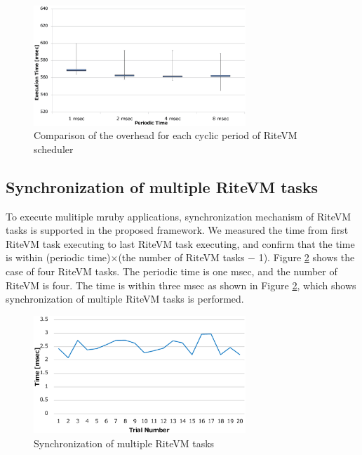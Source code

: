\documentclass{sig-alternate-05-2015}
\begin{document}
\begin{figure}[t]
    \centering
    \includegraphics[width=8cm,clip]{figure/comparison_msec.eps}
    \vspace{1mm}
\caption{Comparison of the overhead for each cyclic period of RiteVM scheduler}
    \vspace{1mm}
\label{fig:comparison_msec}
\end{figure}

\subsection{Synchronization of multiple RiteVM tasks}
To execute mulitiple mruby applications, synchronization mechanism of RiteVM tasks is supported in the proposed framework.
We measured the time from first RiteVM task executing to last RiteVM task executing, and confirm that the time is within (periodic time)$\times$(the number of RiteVM tasks $-$ 1).
Figure \ref{fig:eval_synchronization} shows the case of four RiteVM tasks.
The periodic time is one msec, and the number of RiteVM is four.
The time is within three msec as shown in Figure \ref{fig:eval_synchronization}, which shows synchronization of multiple RiteVM tasks is performed.

\begin{figure}[t]
    \centering
    \includegraphics[width=8cm,clip]{figure/eval_synchronization.eps}
    \vspace{1mm}
\caption{Synchronization of multiple RiteVM tasks}
    \vspace{1mm}
\label{fig:eval_synchronization}
\end{figure}
\end{document}

